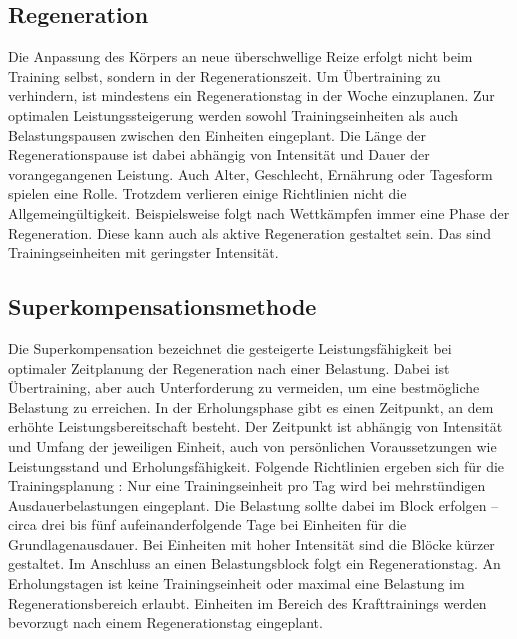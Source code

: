 \subsection{Regeneration}
Die Anpassung des Körpers an neue überschwellige Reize erfolgt nicht beim Training selbst, sondern in der Regenerationszeit. Um Übertraining zu verhindern, ist mindestens ein Regenerationstag in der Woche einzuplanen. \cite{EinfuerungTrainingswissenschaft}
Zur optimalen Leistungssteigerung werden sowohl Trainingseinheiten als auch Belastungspausen zwischen den Einheiten eingeplant. Die Länge der Regenerationspause ist dabei abhängig von Intensität und Dauer der vorangegangenen Leistung. Auch Alter, Geschlecht, Ernährung oder Tagesform spielen eine Rolle. Trotzdem verlieren einige Richtlinien nicht die Allgemeingültigkeit. Beispielsweise folgt nach Wettkämpfen immer eine Phase der Regeneration. Diese kann auch als aktive Regeneration gestaltet sein. Das sind Trainingseinheiten mit geringster Intensität.

\subsection{Superkompensationsmethode}
Die Superkompensation bezeichnet die gesteigerte Leistungsfähigkeit bei optimaler Zeitplanung der Regeneration nach einer Belastung. \cite[163]{Trainingswissenschaft} Dabei ist Übertraining, aber auch Unterforderung zu vermeiden, um eine bestmögliche Belastung zu erreichen. In der Erholungsphase gibt es einen Zeitpunkt, an dem erhöhte Leistungsbereitschaft besteht. Der Zeitpunkt ist abhängig von Intensität und Umfang der jeweiligen Einheit, auch von persönlichen Voraussetzungen wie Leistungsstand und Erholungsfähigkeit. \newline
Folgende Richtlinien ergeben sich für die Trainingsplanung \cite[44-46]{Radsporttraining}: Nur eine Trainingseinheit pro Tag wird bei mehrstündigen Ausdauerbelastungen eingeplant. Die Belastung sollte dabei im Block erfolgen -- circa drei bis fünf aufeinanderfolgende Tage bei Einheiten für die Grundlagenausdauer. Bei Einheiten mit hoher Intensität sind die Blöcke kürzer gestaltet. Im Anschluss an einen Belastungsblock folgt ein Regenerationstag. An Erholungstagen ist keine Trainingseinheit oder maximal eine Belastung im Regenerationsbereich erlaubt. Einheiten im Bereich des Krafttrainings werden bevorzugt nach einem Regenerationstag eingeplant. \cite[60]{Radsporttraining}

